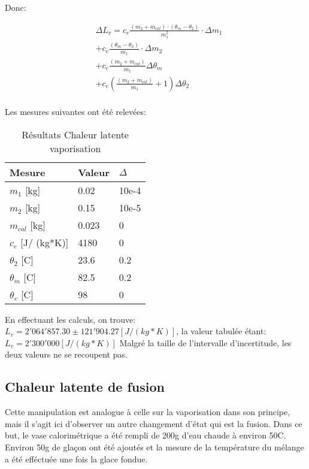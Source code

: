 Donc:

\begin{align*}
    &\Delta L_v = c_e \frac{(m_2 + m_{cal})\cdot (\theta_m - \theta_2)}{m_1^2}\cdot \Delta m_1\\
    &+ c_e \frac{(\theta_m - \theta_2)}{m_1}\cdot \Delta m_2\\
    &+ c_e \frac{(m_2 + m_{cal})}{m_1} \Delta \theta_m\\
    &+ c_e (\frac{(m_2 + m_{cal})}{m_1} + 1)\Delta \theta_2\\
\end{align*}

Les mesures suivantes ont été relevées:

\begin{table}[!h]
    \centering
    \caption{Résultats Chaleur latente vaporisation}
    \begin{tabular}{|l|l|l|}
	\hline
	Mesure	&Valeur	&$\Delta$\\
	\hline
	$m_1$ [kg]	&0.02	&10e-4\\
	$m_2$ [kg]	&0.15	&10e-5\\
	$m_{cal}$ [kg]	&0.023	&0\\
	$c_e$ [J/ (kg*K)]	&4180	&0\\
	$\theta_2$ [C\degree]	&23.6	&0.2\\
	$\theta_m$ [C\degree]	&82.5	&0.2\\
	$\theta_v$ [C\degree]	&98	&0\\
	\hline
    \end{tabular}
\end{table}

En effectuant les calculs, on trouve: $L_v = 2'064'857.30\pm 121'904.27[J/ (kg*K)]$,
la valeur tabulée étant: $L_v = 2'300'000[J/ (kg*K)]$
Malgré la taille de l'intervalle d'incertitude, les deux valeurs ne se recoupent pas.

\subsection{Chaleur latente de fusion}
Cette manipulation est analogue à celle sur la vaporisation dans son principe, mais il s'agit ici d'observer un autre changement d'état qui est la fusion.
Dans ce but, le vase calorimétrique a été rempli de 200g d'eau chaude à environ 50C\degree. Environ 50g de glaçon ont été ajoutés et la mesure de la température du mélange a été efféctuée une fois la glace fondue.

